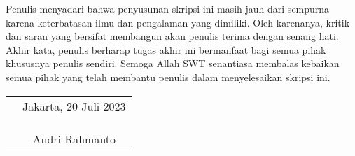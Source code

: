 Penulis menyadari bahwa penyusunan skripsi ini masih jauh dari sempurna karena keterbatasan ilmu dan pengalaman yang dimiliki. Oleh karenanya, kritik dan saran yang bersifat membangun akan penulis terima dengan senang hati. Akhir kata, penulis berharap tugas akhir ini bermanfaat bagi semua pihak khususnya penulis sendiri. Semoga Allah SWT senantiasa membalas kebaikan semua pihak yang telah membantu penulis dalam menyelesaikan skripsi ini.

\vspace{4cm}

\begin{tabular}{p{7.5cm}c}
	&Jakarta, 20 Juli 2023\\
	&\\
	&\\
	&\\
	&Andri Rahmanto
\end{tabular}